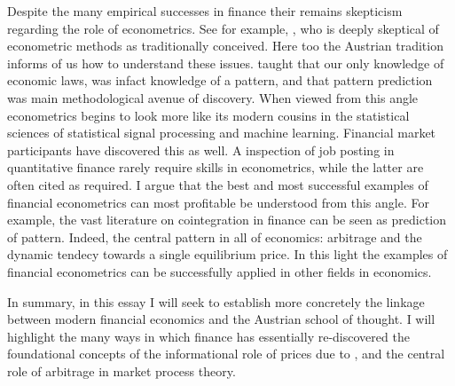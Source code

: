 \documentclass[11pt,]{article}
\begin{document}
Despite the many empirical successes in finance their remains skepticism
regarding the role of econometrics. See for example, \citet{Black1982},
who is deeply skeptical of econometric methods as traditionally
conceived. Here too the Austrian tradition informs of us how to
understand these issues. \citet{Hayek1994} taught that our only
knowledge of economic laws, was infact knowledge of a pattern, and that
pattern prediction was main methodological avenue of discovery. When
viewed from this angle econometrics begins to look more like its modern
cousins in the statistical sciences of statistical signal processing and
machine learning. Financial market participants have discovered this as
well. A inspection of job posting in quantitative finance rarely require
skills in econometrics, while the latter are often cited as required. I
argue that the best and most successful examples of financial
econometrics can most profitable be understood from this angle. For
example, the vast literature on cointegration in finance can be seen as
prediction of pattern. Indeed, the central pattern in all of economics:
arbitrage and the dynamic tendecy towards a single equilibrium price. In
this light the examples of financial econometrics can be successfully
applied in other fields in economics.

In summary, in this essay I will seek to establish more concretely the
linkage between modern financial economics and the Austrian school of
thought. I will highlight the many ways in which finance has essentially
re-discovered the foundational concepts of the informational role of
prices due to \citet{Hayek1945}, and the central role of arbitrage in
market process theory.

\newpage
\singlespacing 

\end{document}
